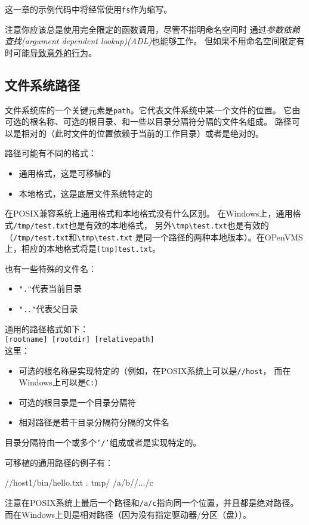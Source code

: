 这一章的示例代码中将经常使用\texttt{fs}作为缩写。

注意你应该总是使用完全限定的函数调用，尽管不指明命名空间时
通过\emph{参数依赖查找(argument dependent lookup)(ADL)}也能够工作。
但如果不用命名空间限定有时可能\hyperref[ADL导致意外行为]{导致意外的行为}。

\subsection{文件系统路径}\label{ch20.2.3}
文件系统库的一个关键元素是\texttt{path}。它代表文件系统中某一个文件的位置。
它由可选的根名称、可选的根目录、和一些以目录分隔符分隔的文件名组成。
路径可以是相对的（此时文件的位置依赖于当前的工作目录）或者是绝对的。

路径可能有不同的格式：
\begin{itemize}
    \item 通用格式，这是可移植的
    \item 本地格式，这是底层文件系统特定的
\end{itemize}
在POSIX兼容系统上通用格式和本地格式没有什么区别。
在Windows上，通用格式\texttt{/tmp/test.txt}也是有效的本地格式，
另外\texttt{\textbackslash tmp\textbackslash test.txt}也是有效的
（\texttt{/tmp/test.txt}和\texttt{\textbackslash tmp\textbackslash test.txt}
是同一个路径的两种本地版本）。在OPenVMS上，相应的本地格式将是\texttt{[tmp]test.txt}。

也有一些特殊的文件名：
\begin{itemize}
    \item \texttt{"."}代表当前目录
    \item \texttt{".."}代表父目录
\end{itemize}
通用的路径格式如下：\\
\hspace*{2em}\texttt{[rootname] [rootdir] [relativepath]}\\
这里：
\begin{itemize}
    \item 可选的根名称是实现特定的（例如，在POSIX系统上可以是\texttt{//host}，
    而在Windows上可以是\texttt{C:}）
    \item 可选的根目录是一个目录分隔符
    \item 相对路径是若干目录分隔符分隔的文件名
\end{itemize}
目录分隔符由一个或多个\texttt{'/'}组成或者是实现特定的。

可移植的通用路径的例子有：
\begin{blacklisting}
    //host1/bin/hello.txt
    .
    tmp/
    /a/b//.../c
\end{blacklisting}
注意在POSIX系统上最后一个路径和\texttt{/a/c}指向同一个位置，并且都是绝对路径。
而在Windows上则是相对路径（因为没有指定驱动器/分区（盘））。

